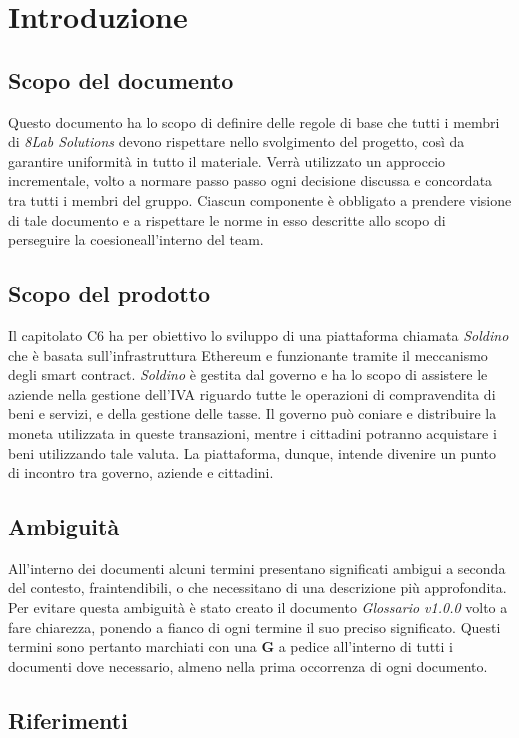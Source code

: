 \section{Introduzione}
\subsection{Scopo del documento}
Questo documento ha lo scopo di definire delle regole di base che tutti i membri 
di \textit{8Lab Solutions} devono rispettare nello svolgimento del progetto, 
così da garantire uniformità in tutto il materiale. Verrà utilizzato un 
approccio incrementale, volto a normare passo passo ogni decisione discussa e 
concordata tra tutti i membri del gruppo. Ciascun componente è obbligato a 
prendere visione di tale documento e a rispettare le norme in esso descritte 
allo scopo di perseguire la coesione\glosp all'interno del team.

\subsection{Scopo del prodotto}
Il capitolato C6 ha per obiettivo lo sviluppo di una piattaforma chiamata \textit{Soldino} che è basata sull'infrastruttura Ethereum\glo{} e funzionante tramite il meccanismo degli smart contract\glo{}. \textit{Soldino} è gestita dal governo e ha lo scopo di assistere le aziende nella gestione dell'IVA riguardo tutte le operazioni di compravendita di beni e servizi, e della gestione delle tasse. Il governo può coniare e 
distribuire la moneta utilizzata in queste transazioni, mentre i cittadini 
potranno acquistare i beni utilizzando tale valuta. La piattaforma, dunque, 
intende divenire un punto di incontro tra governo, aziende e cittadini.

\subsection{Ambiguità}
All'interno dei documenti alcuni termini presentano significati ambigui  a  
seconda del contesto, fraintendibili, o che necessitano di una descrizione più approfondita. Per evitare questa ambiguità è stato creato il documento 
\textit{Glossario v1.0.0} volto a fare chiarezza, ponendo a fianco di ogni 
termine il suo preciso significato. Questi termini sono pertanto marchiati con una \textbf{G} a pedice all'interno di tutti i documenti dove necessario, almeno nella prima occorrenza di ogni documento.

\subsection{Riferimenti}
